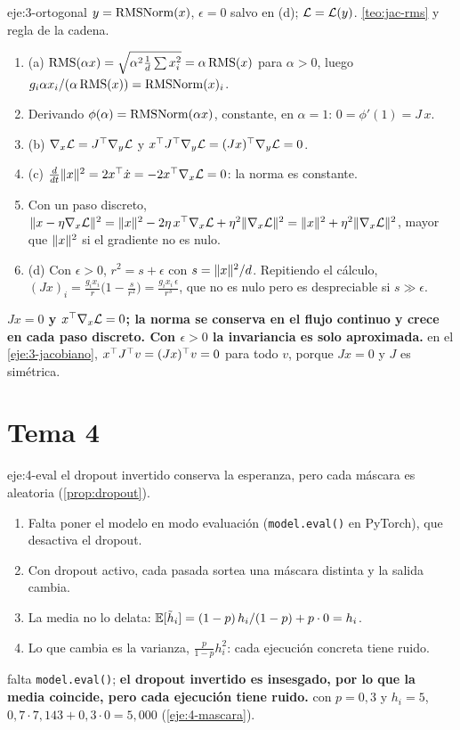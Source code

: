 \begin{solucion}{eje:3-ortogonal}
\datos $y=\operatorname{RMSNorm}(x)$, $\epsilon=0$ salvo en (d); $\mathcal{L}=\mathcal{L}(y)$.
\planteamiento \cref{teo:jac-rms} y regla de la cadena.
\pasos
\begin{enumerate}[label=\arabic*.]
  \item (a) $\operatorname{RMS}(\alpha x)=\sqrt{\alpha^{2}\frac1d\sum x_i^{2}}=\alpha\operatorname{RMS}(x)$ para $\alpha>0$, luego $g_i\alpha x_i/(\alpha\operatorname{RMS}(x))=\operatorname{RMSNorm}(x)_i$.
  \item Derivando $\phi(\alpha)=\operatorname{RMSNorm}(\alpha x)$, constante, en $\alpha=1$: $0=\phi'(1)=J\,x$.
  \item (b) $\nabla_x\mathcal{L}=J^{\top}\nabla_y\mathcal{L}$ y $x^{\top} J^{\top}\nabla_y\mathcal{L}=(Jx)^{\top}\nabla_y\mathcal{L}=0$.
  \item (c) $\frac{d}{dt}\lVert x\rVert^{2}=2x^{\top}\dot x=-2x^{\top}\nabla_x\mathcal{L}=0$: la norma es constante.
  \item Con un paso discreto, $\lVert x-\eta\nabla_x\mathcal{L}\rVert^{2}=\lVert x\rVert^{2}-2\eta\,x^{\top}\nabla_x\mathcal{L}+\eta^{2}\lVert\nabla_x\mathcal{L}\rVert^{2}=\lVert x\rVert^{2}+\eta^{2}\lVert\nabla_x\mathcal{L}\rVert^{2}$, mayor que $\lVert x\rVert^{2}$ si el gradiente no es nulo.
  \item (d) Con $\epsilon>0$, $r^{2}=s+\epsilon$ con $s=\lVert x\rVert^{2}/d$. Repitiendo el cálculo, $(Jx)_i=\frac{g_ix_i}{r}\bigl(1-\frac{s}{r^{2}}\bigr)=\frac{g_ix_i\,\epsilon}{r^{3}}$, que no es nulo pero es despreciable si $s\gg\epsilon$.
\end{enumerate}
\resultado \textbf{$Jx=0$ y $x^{\top}\nabla_x\mathcal{L}=0$; la norma se conserva en el flujo continuo y crece en cada paso discreto. Con $\epsilon>0$ la invariancia es solo aproximada.}
\comprobacion en el \cref{eje:3-jacobiano}, $x^{\top} J^{\top} v=(Jx)^{\top} v=0$ para todo $v$, porque $Jx=0$ y $J$ es simétrica.
\end{solucion}

\section{Tema 4}

\begin{solucion}{eje:4-eval}
\planteamiento el dropout invertido conserva la esperanza, pero cada máscara es aleatoria (\cref{prop:dropout}).
\pasos
\begin{enumerate}[label=\arabic*.]
  \item Falta poner el modelo en modo evaluación (\texttt{model.eval()} en PyTorch), que desactiva el dropout.
  \item Con dropout activo, cada pasada sortea una máscara distinta y la salida cambia.
  \item La media no lo delata: $\mathbb{E}[\tilde h_i]=(1-p)\,h_i/(1-p)+p\cdot 0=h_i$.
  \item Lo que cambia es la varianza, $\frac{p}{1-p}h_i^{2}$: cada ejecución concreta tiene ruido.
\end{enumerate}
\resultado falta \texttt{model.eval()}; \textbf{el dropout invertido es insesgado, por lo que la media coincide, pero cada ejecución tiene ruido.}
\comprobacion con $p=0{,}3$ y $h_i=5$, $0{,}7\cdot 7{,}143+0{,}3\cdot 0=5{,}000$ (\cref{eje:4-mascara}).
\end{solucion}

